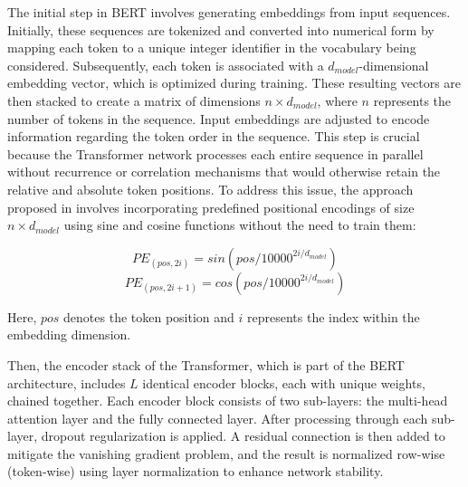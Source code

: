 \documentclass[11pt,a4paper,reqno]{amsart} %
\theoremstyle{definition}
\numberwithin{equation}{section}          %
\begin{document}
The initial step in BERT involves generating embeddings from input sequences. Initially, these sequences are tokenized and converted into numerical form by mapping each token to a unique integer identifier in the vocabulary being considered. Subsequently, each token is associated with a $d_{model}$-dimensional embedding vector, which is optimized during training. These resulting vectors are then stacked to create a matrix of dimensions $n \times d_{model}$, where $n$ represents the number of tokens in the sequence.
Input embeddings are adjusted to encode information regarding the token order in the sequence. This step is crucial because the Transformer network processes each entire sequence in parallel without recurrence or correlation mechanisms that would otherwise retain the relative and absolute token positions. To address this issue, the approach proposed in \cite{2017arXiv170603762V} involves incorporating predefined positional encodings of size $n \times d_{model}$ using sine and cosine functions without the need to train them:

\begin{equation}
PE_{(pos,2i)} = sin(pos/10000^{2i/d_{model}})
\end{equation}
\begin{equation}
PE_{(pos,2i+1)} = cos(pos/10000^{2i/d_{model}})
\end{equation}

Here, $pos$ denotes the token position and $i$ represents the index within the embedding dimension.

Then, the encoder stack of the Transformer, which is part of the BERT architecture, includes $L$ identical encoder blocks, each with unique weights, chained together. Each encoder block consists of two sub-layers: the multi-head attention layer and the fully connected layer. After processing through each sub-layer, dropout regularization \cite{JMLR:v15:srivastava14a} is applied. A residual connection is then added to mitigate the vanishing gradient problem, and the result is normalized row-wise (token-wise) using layer normalization to enhance network stability. 
\end{document}
